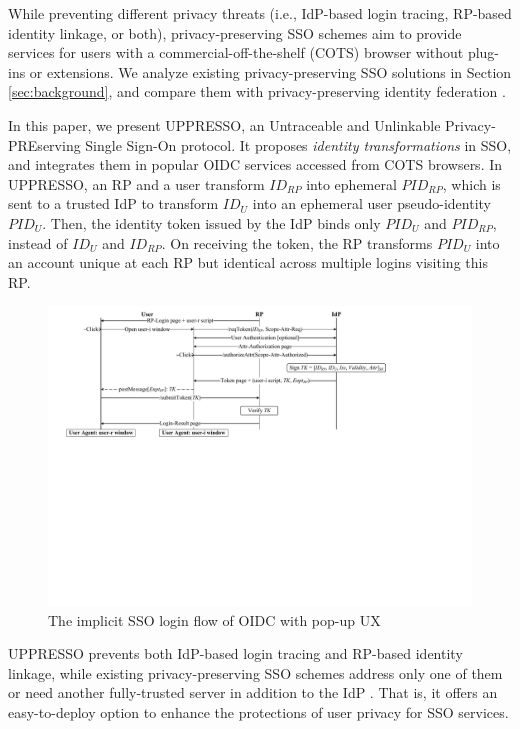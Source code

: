 While preventing different privacy threats (i.e., IdP-based login tracing, RP-based identity linkage, or both),
privacy-preserving SSO schemes \cite{maler2008venn, NIST2017draft, BrowserID, save-flow, SPRESSO,miso,POIDC} aim to provide services for users with a commercial-off-the-shelf (COTS) browser without plug-ins or extensions.
We analyze existing privacy-preserving SSO solutions in Section \ref{sec:background},
    and compare them with privacy-preserving identity federation \cite{PseudoID, ELPASSO, UnlimitID, Opaak, uprov, hyperledge-idemix}.

In this paper, we present UPPRESSO, an Untraceable and Unlinkable Privacy-PREserving Single Sign-On protocol.
It proposes {\em identity transformations} in SSO,
 and integrates them in popular OIDC services accessed from COTS browsers.
In UPPRESSO, an RP and a user transform $ID_{RP}$ into ephemeral $PID_{RP}$, which is sent to a trusted IdP to transform $ID_U$ into an ephemeral user pseudo-identity $PID_U$.
Then, the identity token issued by the IdP binds only $PID_U$ and $PID_{RP}$, instead of $ID_U$ and $ID_{RP}$. On receiving the token, %
 the RP transforms $PID_U$ into an account unique at each RP but identical across multiple logins visiting this RP.


\begin{figure}[tb]
  \centering
  \includegraphics[width=0.86\linewidth]{fig/OIDC-pop.pdf}
  \caption{The implicit SSO login flow of OIDC with pop-up UX}
  \label{fig:OpenID}
\end{figure}

UPPRESSO prevents both IdP-based login tracing and RP-based identity linkage, while existing privacy-preserving SSO schemes address only one of them \cite{BrowserID, SPRESSO, NIST2017draft, save-flow,POIDC} or need another fully-trusted server in addition to the IdP \cite{miso,SPRESSO}.
That is, it offers an easy-to-deploy option to enhance the protections of user privacy for SSO services.

